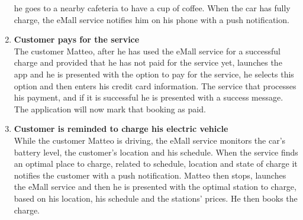 \begin{enumerate}
     he goes to a nearby cafeteria to have a cup of coffee. When the car has fully charge, the eMall service notifies him on his phone with a push notification.
    \item \textbf{Customer pays for the service}\\
    The customer Matteo, after he has used the eMall service for a successful charge and provided that he has not paid for the service yet,
    launches the app and he is presented with the option to pay for the service, 
    he selects this option and then enters his credit card information.
    The service that processes his payment, and if it is successful he is presented with a success message. The application will now mark that booking as paid.
    \item \textbf{Customer is reminded to charge his electric vehicle}\\
    While the customer Matteo is driving, the eMall service monitors the car's battery level, the customer's location and his schedule. 
    When the service finds an optimal place to charge, related to schedule, location and state of charge it notifies the customer with a push notification.
    Matteo then stops, launches the eMall service and then he is presented with the optimal station to charge, based on his location, his schedule and the stations' prices. He then books the charge.
    

\end{enumerate}
